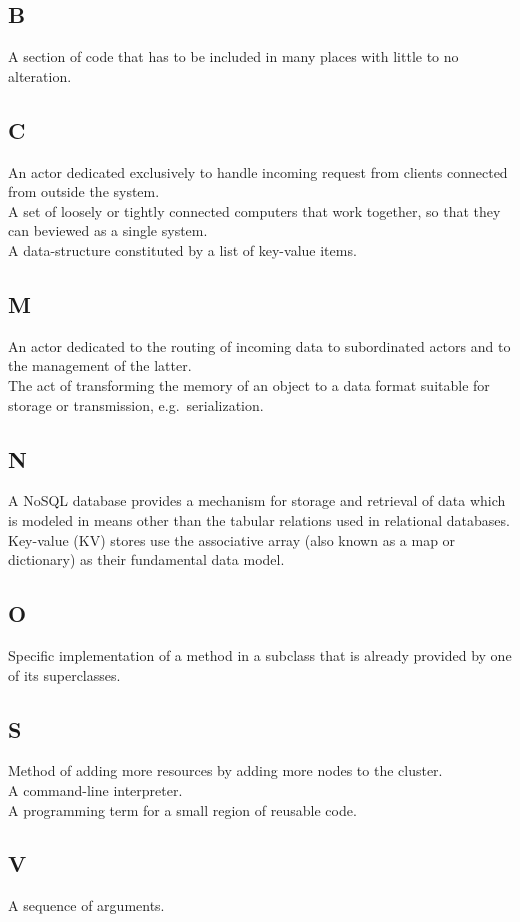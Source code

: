 \documentclass{scalatekids-article}
\begin{document}
\subsection{B}
 A section of code that has to be
included in many places with little to no alteration.
\subsection{C}
 An actor dedicated exclusively to handle
incoming request from clients connected from outside the system.\\

 A set of loosely or tightly connected computers that
work together, so that they can beviewed as a single system.\\

 A data-structure constituted by a list of key-value items.\\

\subsection{M}
 An actor dedicated to the routing of incoming data to subordinated
actors and to the management of the latter.\\

 The act of transforming the memory of an object to a data format suitable
for storage or transmission, e.g.\ serialization.\\

\subsection{N}
 A NoSQL database provides a mechanism for storage and retrieval
of data which is modeled in means other than the tabular relations used in
relational databases. Key-value (KV) stores use the associative array (also known
as a map or dictionary) as their fundamental data model.\\
\subsection{O}
 Specific implementation of a method in a subclass that
is already provided by one of its superclasses.\\
\subsection{S}
 Method of adding more resources by adding more nodes to the
cluster.\\

 A command-line interpreter.\\

 A programming term for a small region of reusable code.\\

\subsection{V}
 A sequence of arguments.\\
\end{document}
